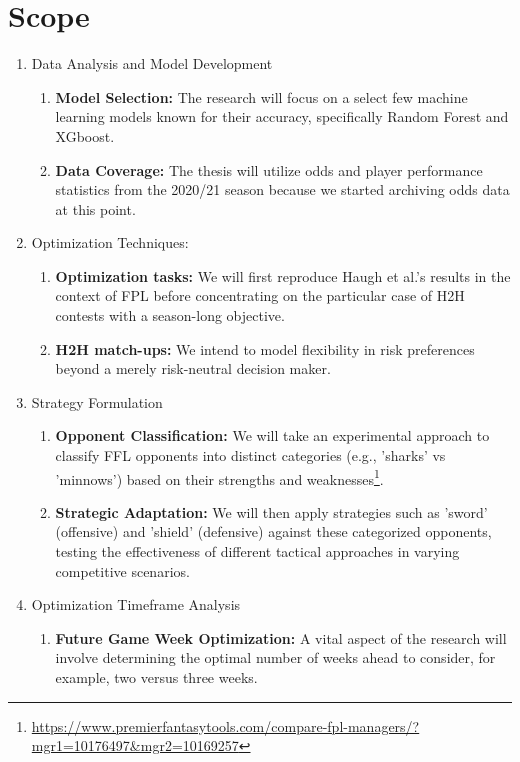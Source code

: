 \documentclass[12pt,oneside,a4paper]{book}
\theoremstyle{definition}
\theoremstyle{remark}
\begin{document}
		\section{Scope}
			\begin{enumerate}
				\item[(i)] Data Analysis and Model Development
				\begin{enumerate}
					\item \textbf{Model Selection:} The research will focus on a select few machine learning models known for their accuracy, specifically Random Forest and XGboost.
					\item \textbf{Data Coverage:} The thesis will utilize odds and player performance statistics from the 2020/21 season because we started archiving odds data at this point.
				\end{enumerate}

				\item[(ii)] Optimization Techniques:
				\begin{enumerate}
					\item \textbf{Optimization tasks:} We will first reproduce Haugh et al.’s results in the context of FPL before concentrating on the particular case of H2H contests with a season-long objective.
					\item \textbf{H2H match-ups:} We intend to model flexibility in risk preferences beyond a merely risk-neutral decision maker.
				\end{enumerate}

				\item[(iii)] Strategy Formulation
				\begin{enumerate}
					\item \textbf{Opponent Classification:} We will take an experimental approach to classify FFL opponents into distinct categories (e.g., 'sharks' vs 'minnows') based on their strengths and weaknesses\footnote{\url{https://www.premierfantasytools.com/compare-fpl-managers/?mgr1=10176497&mgr2=10169257}}.
					\item \textbf{Strategic Adaptation:} We will then apply strategies such as 'sword' (offensive) and 'shield' (defensive) against these categorized opponents, testing the effectiveness of different tactical approaches in varying competitive scenarios.
				\end{enumerate}

				\item[(iv)] Optimization Timeframe Analysis
				\begin{enumerate}
					\item \textbf{Future Game Week Optimization:} A vital aspect of the research will involve determining the optimal number of weeks ahead to consider, for example, two versus three weeks.
				\end{enumerate}


\end{enumerate}
\end{document}
